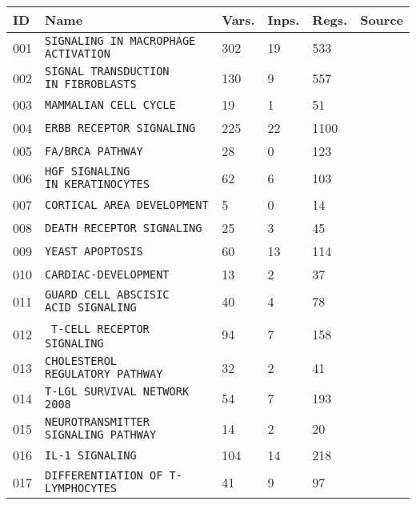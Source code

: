 \documentclass{article}
\begin{document}
\begin{center}
	\begin{tabular}{ | C{16pt} | C{144pt} | C{25pt} | C{25pt} | C{25pt} | C{35pt} | }
		\hline
		ID & Name & Vars. & Inps. & Regs. & Source \\  & \texttt{SIGNALING IN MACROPHAGE ACTIVATION} & 302 & 19 & 533 & \cite{bbm-001, cell-collective} \\  & \texttt{SIGNAL TRANSDUCTION IN~FIBROBLASTS} & 130 & 9 & 557 & \cite{bbm-002, cell-collective} \\  & \texttt{MAMMALIAN CELL CYCLE} & 19 & 1 & 51 & \cite{bbm-003, cell-collective} \\  & \texttt{ERBB RECEPTOR SIGNALING} & 225 & 22 & 1100 & \cite{bbm-004, cell-collective}  \\  & \texttt{FA/BRCA PATHWAY} & 28 & 0 & 123 & \cite{bbm-005, cell-collective} \\  & \texttt{HGF SIGNALING IN~KERATINOCYTES} & 62 & 6 & 103 & \cite{bbm-006, cell-collective} \\  & \texttt{CORTICAL AREA DEVELOPMENT} & 5 & 0 & 14 & \cite{bbm-007, cell-collective} \\  & \texttt{DEATH RECEPTOR SIGNALING} & 25 & 3 & 45 & \cite{bbm-008, cell-collective} \\  & \texttt{YEAST APOPTOSIS} & 60 & 13 & 114 & \cite{bbm-009, cell-collective} \\  & \texttt{CARDIAC-DEVELOPMENT} & 13 & 2 & 37 & \cite{bbm-010, cell-collective} \\  & \texttt{GUARD CELL ABSCISIC ACID~SIGNALING} & 40 & 4 & 78 & \cite{bbm-011, cell-collective} \\  & \texttt{T-CELL RECEPTOR SIGNALING} & 94 & 7 & 158 & \cite{bbm-012, cell-collective} \\  & \texttt{CHOLESTEROL REGULATORY~PATHWAY} & 32 & 2 & 41 & \cite{bbm-013, cell-collective} \\  & \texttt{T-LGL SURVIVAL NETWORK 2008} & 54 & 7 & 193 & \cite{bbm-014, cell-collective} \\  & \texttt{NEUROTRANSMITTER SIGNALING~PATHWAY} & 14 & 2 & 20 & \cite{bbm-015, cell-collective} \\  & \texttt{IL-1 SIGNALING} & 104 & 14 & 218 & \cite{bbm-016-019, cell-collective} \\  & \texttt{DIFFERENTIATION OF T-LYMPHOCYTES}  & 41 & 9 & 97 & \cite{bbm-017, cell-collective} \\ \hline

\end{tabular}
\end{center}
\end{document}
